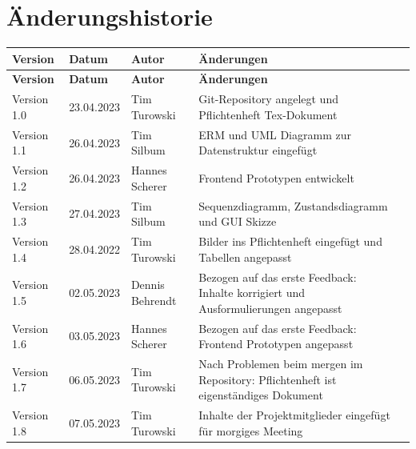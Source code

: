



\maketitle

\newpage
\section{Änderungshistorie}

\begin{flushleft}
		\begin{longtable}{p{2cm}p{2cm}p{3cm}p{9cm}c}
            \toprule
            \textbf{Version} & \textbf{Datum} & \textbf{Autor} & \textbf{Änderungen}\\
            \midrule\endfirsthead
            \toprule
            \textbf{Version} & \textbf{Datum} & \textbf{Autor} & \textbf{Änderungen}\\
            \midrule\endhead
            	Version 1.0 & 23.04.2023 & Tim Turowski & Git-Repository angelegt und Pflichtenheft Tex-Dokument \\ \midrule
				Version 1.1 & 26.04.2023 & Tim Silbum & ERM und UML Diagramm zur Datenstruktur eingefügt \\ \midrule
				Version 1.2 & 26.04.2023 & Hannes Scherer & Frontend Prototypen entwickelt \\ \midrule
				Version 1.3 & 27.04.2023 & Tim Silbum & Sequenzdiagramm, Zustandsdiagramm und GUI Skizze \\ \midrule
 				Version 1.4 & 28.04.2022 & Tim Turowski & Bilder ins Pflichtenheft eingefügt und Tabellen angepasst \\ \midrule
				Version 1.5 & 02.05.2023 & Dennis Behrendt & Bezogen auf das erste Feedback: Inhalte korrigiert und Ausformulierungen angepasst \\ \midrule
				Version 1.6 & 03.05.2023 & Hannes Scherer & Bezogen auf das erste Feedback: Frontend Prototypen angepasst \\ \midrule
				Version 1.7 & 06.05.2023 & Tim Turowski & Nach Problemen beim mergen im Repository: Pflichtenheft ist eigenständiges Dokument \\ \midrule
				Version 1.8 & 07.05.2023 & Tim Turowski & Inhalte der Projektmitglieder eingefügt für morgiges Meeting \\ 
            \bottomrule
    \end{longtable}
\end{flushleft}

